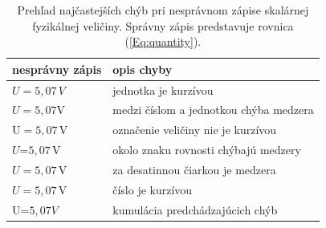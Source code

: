 \begin{table}[ht]
\centering
\caption{Prehľad najčastejších chýb pri nesprávnom zápise
skalárnej fyzikálnej veličiny.
Správny zápis predstavuje rovnica (\ref{Eq:quantity}).}
\vspace{12pt}
\begin{tabular}{@{}ll@{}}
  \toprule
  \textbf{nesprávny zápis} & \textbf{opis chyby}\\
  \midrule
  $U = 5{,}07\,V$ & jednotka je kurzívou\\
  $U = 5{,}07\mathrm V$ & medzi číslom a jednotkou chýba medzera\\
  $\mathrm U = 5{,}07\,\mathrm V$ & označenie veličiny nie je kurzívou \\
  $U$=$5{,}07\,\mathrm V$ & okolo znaku rovnosti chýbajú medzery\\
  $U = 5,07\,\mathrm{V}$ & za desatinnou čiarkou je medzera\\
  $U = \mathit{5{,}07}\,\mathrm{V}$ & číslo je kurzívou\\
  U=$\mathit{5,07}V$ & kumulácia predchádzajúcich chýb\\
  \bottomrule
\end{tabular}
\end{table}

